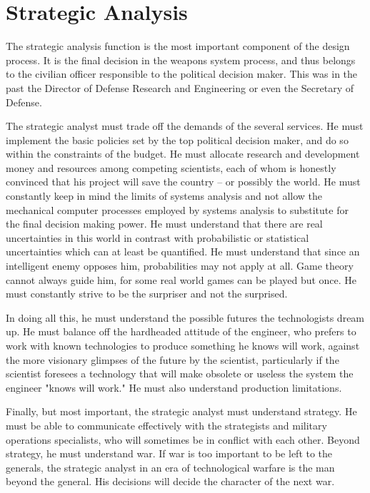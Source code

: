 \section{Strategic Analysis}
The strategic analysis function is the most important component of the design process. It is the final decision in the weapons system process, and thus belongs to the civilian officer responsible to the political decision maker. This was in the past the Director of Defense Research and Engineering or even the Secretary of Defense.

The strategic analyst must trade off the demands of the several services. He must implement the basic policies set by the top political decision maker, and do so within the constraints of the budget. He must allocate research and development money and resources among competing scientists, each of whom is honestly convinced that his project will save the country -- or possibly the world. He must constantly keep in mind the limits of systems analysis and not allow the mechanical computer processes employed by systems analysis to substitute for the final decision making power. He must understand that there are real uncertainties in this world in contrast with probabilistic or statistical uncertainties which can at least be quantified. He must understand that since an intelligent enemy opposes him, probabilities may not apply at all. Game theory cannot always guide him, for some real world games can be played but once. He must constantly strive to be the surpriser and not the surprised.

In doing all this, he must understand the possible futures the technologists dream up. He must balance off the hardheaded attitude of the engineer, who prefers to work with known technologies to produce something he knows will work, against the more visionary glimpses of the future by the scientist, particularly if the scientist foresees a technology that will make obsolete or useless the system the engineer "knows will work." He must also understand production limitations.

Finally, but most important, the strategic analyst must understand strategy. He must be able to communicate effectively with the strategists and military operations specialists, who will sometimes be in conflict with each other. Beyond strategy, he must understand war. If war is too important to be left to the generals, the strategic analyst in an era of technological warfare is the man beyond the general. His decisions will decide the character of the next war.

